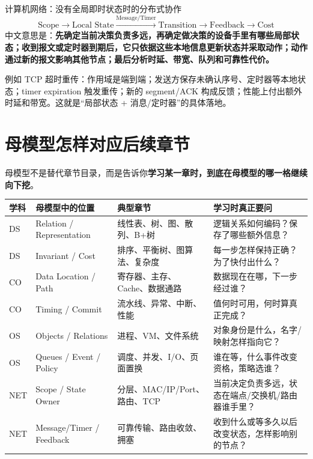 \documentclass[11pt,a4paper,openany]{ctexbook}
\newcommand{\key}[1]{\textbf{\color{deep}#1}}
\begin{document}
\begin{corebox}{计算机网络：没有全局即时状态时的分布式协作}
\[
\boxed{\text{Scope}\rightarrow\text{Local State}\xrightarrow{\text{Message/Timer}}\text{Transition}\rightarrow\text{Feedback}\rightarrow\text{Cost}}
\]
中文意思是：\key{先确定当前决策负责多远，再确定做决策的设备手里有哪些局部状态；收到报文或定时器到期后，它只依据这些本地信息更新状态并采取动作；动作通过新的报文影响其他节点；最后分析时延、带宽、队列和可靠性代价。}
\end{corebox}

例如 TCP 超时重传：作用域是端到端；发送方保存未确认序号、定时器等本地状态；timer expiration 触发重传；新的 segment/ACK 构成反馈；性能上付出额外时延和带宽。这就是“局部状态 + 消息/定时器”的具体落地。

\section{母模型怎样对应后续章节}
母模型不是替代章节目录，而是告诉你\key{学习某一章时，到底在母模型的哪一格继续向下挖}。

\begin{longtable}{L{2.0cm}L{4.1cm}L{4.2cm}L{\dimexpr\linewidth-11.57cm\relax}}
\toprule
\textbf{学科} & \textbf{母模型中的位置} & \textbf{典型章节} & \textbf{学习时真正要问}\\
\midrule
DS & Relation / Representation & 线性表、树、图、散列、B+树 & 逻辑关系如何编码？保存了哪些额外信息？ \\
DS & Invariant / Cost & 排序、平衡树、图算法、复杂度 & 每一步怎样保持正确？为了快付出什么？ \\
CO & Data Location / Path & 寄存器、主存、Cache、数据通路 & 数据现在在哪，下一步经过谁？ \\
CO & Timing / Commit & 流水线、异常、中断、性能 & 值何时可用，何时算真正完成？ \\
OS & Objects / Relations & 进程、VM、文件系统 & 对象身份是什么，名字/映射怎样指向它？ \\
OS & Queues / Event / Policy & 调度、并发、I/O、页面置换 & 谁在等，什么事件改变资格，策略选谁？ \\
NET & Scope / State Owner & 分层、MAC/IP/Port、路由、TCP & 当前决定负责多远，状态在端点/交换机/路由器谁手里？ \\
NET & Message/Timer / Feedback & 可靠传输、路由收敛、拥塞 & 收到什么或等多久以后改变状态，怎样影响别的节点？ \\
\bottomrule
\end{longtable}
\end{document}
